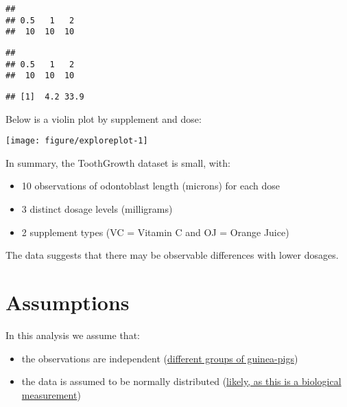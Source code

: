 \documentclass[legalpaper]{article}
\newenvironment{Shaded}{\begin{snugshade}}{\end{snugshade}}
\newcommand{\KeywordTok}[1]{\textcolor[rgb]{0.13,0.29,0.53}{\textbf{{#1}}}}
\newcommand{\StringTok}[1]{\textcolor[rgb]{0.31,0.60,0.02}{{#1}}}
\newcommand{\NormalTok}[1]{{#1}}
\begin{document}
\begin{verbatim}
## 
## 0.5   1   2 
##  10  10  10
\end{verbatim}

\begin{Shaded}
\end{Shaded}

\begin{verbatim}
## 
## 0.5   1   2 
##  10  10  10
\end{verbatim}

\begin{Shaded}
\end{Shaded}

\begin{verbatim}
## [1]  4.2 33.9
\end{verbatim}

Below is a violin plot by supplement and dose:

\begin{center}\texttt{[image: figure/exploreplot-1]} \end{center}

In summary, the ToothGrowth dataset is small, with:

\begin{itemize}
\itemsep1pt\parskip0pt
\item
  10 observations of odontoblast length (microns) for each dose
\item
  3 distinct dosage levels (milligrams)
\item
  2 supplement types (VC = Vitamin C and OJ = Orange Juice)
\end{itemize}

The data suggests that there may be observable differences with lower
dosages.

\section{Assumptions}\label{assumptions}

In this analysis we assume that:

\begin{itemize}
\itemsep1pt\parskip0pt
\item
  the observations are independent
  (\href{http://jn.nutrition.org/content/33/5/491.full.pdf}{different
  groups of guinea-pigs})
\item
  the data is assumed to be normally distributed
  (\href{https://en.wikipedia.org/wiki/Normal_distribution\#/Approximate_normality}{likely,
  as this is a biological measurement})
\end{itemize}
\end{document}
